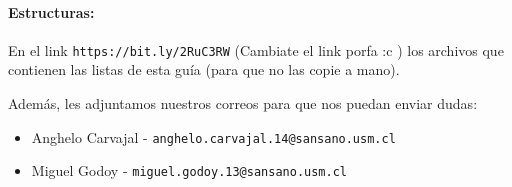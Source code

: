 \paragraph{Estructuras:} En el link \texttt{https://bit.ly/2RuC3RW} (Cambiate el link porfa :c ) los archivos que contienen las listas de esta guía (para que no las copie a mano).

Además, les adjuntamos nuestros correos para que nos puedan enviar dudas:
\begin{itemize}
    \item Anghelo Carvajal - \texttt{anghelo.carvajal.14@sansano.usm.cl}
    \item Miguel Godoy - \texttt{miguel.godoy.13@sansano.usm.cl}

\end{itemize}